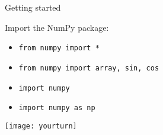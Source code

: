 \begin{frame}[fragile, t]{Getting started}

 Import the NumPy package:
  \begin{itemize}
 \item \lstinline{from numpy import *}
 \item \lstinline{from numpy import array, sin, cos}
 \item \lstinline{import numpy}
 \item \lstinline{import numpy as np}
\end{itemize}
            \begin{center}
             \texttt{[image: yourturn]}
            \end{center}
\end{frame}

